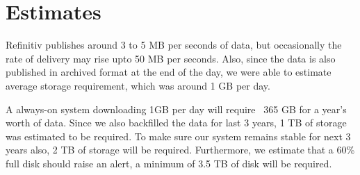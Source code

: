 \section{Estimates}
Refinitiv publishes around 3 to 5 MB per seconds of data, but occasionally the rate of delivery may rise upto 50 MB per seconds. Also, since the data is also published in archived format at the end of the day, we were able to estimate average storage requirement, which was around 1 GB per day.

A always-on system downloading 1GB per day will require ~365 GB for a year's worth of data. Since we also backfilled the data for last 3 years, 1 TB of storage was estimated to be required. To make sure our system remains stable for next 3 years also, 2 TB of storage will be required. Furthermore, we estimate that a 60\% full disk should raise an alert, a minimum of 3.5 TB of disk will be required.



